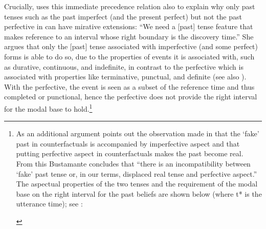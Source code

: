 \documentclass[output=paper,
colorlinks,
citecolor=brown,
newtxmath
]{langscibook}
\begin{document}
Crucially, \citet[112--114]{Bustamante2013} uses this immediate precedence relation also to explain why only past tenses such as the past imperfect (and the present perfect) but not the past perfective in  can have mirative extensions:
``We need a [past] tense feature that makes reference to an interval whose right boundary is the discovery time.''
She argues that only the [past] tense associated with imperfective (and some perfect) forms is able to do so, due to the properties of events it is associated with, such as durative, continuous, and indefinite, in contrast to the perfective which is associated with properties like terminative, punctual, and definite (see also \citealt[300]{Cipria.Roberts2000}). With the perfective, the event is seen as a subset of the reference time and thus completed or punctional, hence the perfective does not provide the right interval for the modal base to hold.\footnote{As an additional argument \citet[112--113]{Bustamante2013} points out the observation made in \citet{Iatridou2000} that the `fake' past in counterfactuals is accompanied by imperfective aspect and that putting perfective aspect in counterfactuals makes the past become real. From this Bustamante concludes that ``there is an incompatibility between `fake' past tense or, in our terms, displaced real tense and perfective aspect.'' The aspectual properties of the two tenses and the requirement of the modal base on the right interval for the past beliefs are shown below (where t* is the utterance time); see \citet[114]{Bustamante2013}:\\
\begin{center}
\end{center}
}
\end{document}
